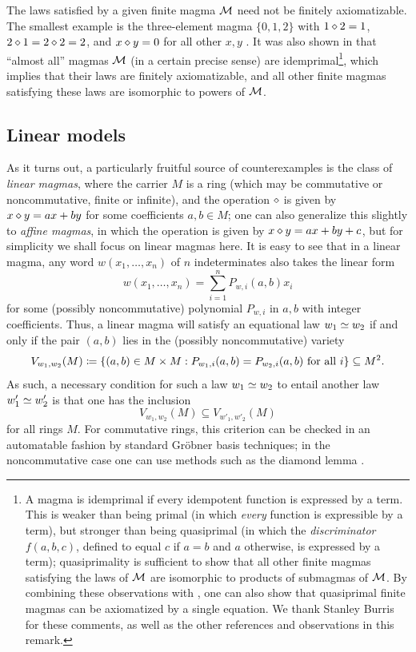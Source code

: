 \begin{remark} The laws satisfied by a given finite magma ${\mathcal{M}}$ need not be finitely axiomatizable.  The smallest example is the three-element magma $\{0,1,2\}$ with $1 \diamond 2 = 1$, $2 \diamond 1 = 2 \diamond 2 = 2$, and $x \diamond y = 0$ for all other $x,y$ \cite{murskii-1}.  It was also shown in \cite{murskii-2} that ``almost all'' magmas ${\mathcal{M}}$ (in a certain precise sense) are idemprimal\footnote{A magma is idemprimal if every idempotent function is expressed by a term.  This is weaker than being primal (in which \emph{every} function is expressible by a term), but stronger than being quasiprimal (in which the \emph{discriminator} $f(a,b,c)$, defined to equal $c$ if $a=b$ and $a$ otherwise, is expressed by a term); quasiprimality is sufficient to show that all other finite magmas satisfying the laws of ${\mathcal{M}}$ are isomorphic to products of submagmas of ${\mathcal{M}}$.  By combining these observations with \cite{Padmanabhan}, one can also show that quasiprimal finite magmas can be axiomatized by a single equation.  We thank Stanley Burris for these comments, as well as the other references and observations in this remark.}, which implies that their laws are finitely axiomatizable, and all other finite magmas satisfying these laws are isomorphic to powers of ${\mathcal{M}}$.
\end{remark}

\subsection{Linear models}\label{linear-sec}

As it turns out, a particularly fruitful source of counterexamples is the class of \emph{linear magmas}, where the carrier $M$ is a ring (which may be commutative or noncommutative, finite or infinite), and the operation $\diamond$ is given by $x \diamond y = ax + by$ for some coefficients $a,b \in M$; one can also generalize this slightly to \emph{affine magmas}, in which the operation is given by $x \diamond y = ax + by + c$, but for simplicity we shall focus on linear magmas here.  It is easy to see that in a linear magma, any word $w(x_1,\dots,x_n)$ of $n$ indeterminates also takes the linear form
$$ w(x_1,\dots,x_n) = \sum_{i=1}^n P_{w,i}(a,b) x_i$$
for some (possibly noncommutative) polynomial $P_{w,i}$ in $a,b$ with integer coefficients.  Thus, a linear magma will satisfy an equational law $w_1 \simeq w_2$ if and only if the pair $(a,b)$ lies in the (possibly noncommutative) variety
\begin{equation}\label{variety}
  V_{w_1,w_2}(M) \coloneqq \{ (a,b) \in M \times M: P_{w_1,i}(a,b) = P_{w_2,i}(a,b) \hbox{ for all } i \} \subseteq M^2.
\end{equation}
As such, a necessary condition for such a law $w_1 \simeq w_2$ to entail another law $w'_1 \simeq w'_2$ is that one has the inclusion
$$ V_{w_1,w_2}(M) \subseteq V_{w'_1,w'_2}(M)
$$
for all rings $M$.  For commutative rings, this criterion can be checked in an automatable fashion by standard Gr\"obner basis techniques; in the noncommutative case one can use methods such as the diamond lemma \cite{diamond-lemma}.

